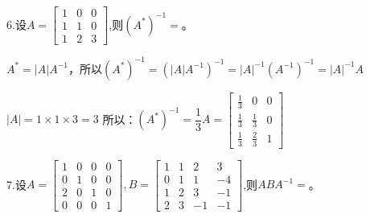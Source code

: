 \documentclass{article}
\begin{document}
6.设$A=
\begin{bmatrix}
  1 & 0 & 0\\
  1 & 1 & 0\\
  1 & 2 & 3
\end{bmatrix}
$,则$(A^*)^{-1}=$\underline{\hphantom{~~~~~~~~~~}}。

\begin{jie}
$A^*=|A|A^{-1}$，所以$(A^*)^{-1}=(|A|A^{-1})^{-1}=|A|^{-1}(A^{-1})^{-1}=|A|^{-1}A$

$|A|=1\times 1\times 3=3$
所以：$(A^*)^{-1}=\dfrac{1}{3}A=\begin{bmatrix}
  \frac{1}{3} & 0 & 0\\
  \frac{1}{3} & \frac{1}{3} & 0\\
  \frac{1 }{3}& \frac{2}{3} & 1
\end{bmatrix}$
\end{jie}

7.设$A=
\begin{bmatrix}
  1 & 0 & 0 & 0\\
  0 & 1 & 0 & 0\\
  2 & 0 & 1 & 0\\
  0 & 0 & 0 & 1
\end{bmatrix},B=
\begin{bmatrix}
  1 & 1 & 2 & 3\\
  0 & 1 & 1 & -4\\
  1 & 2 & 3 & -1\\
  2 & 3 & -1 & -1
\end{bmatrix}
$,则$ABA^{-1}=$\underline{\hphantom{~~~~~~~~~~}}。
\end{document}
